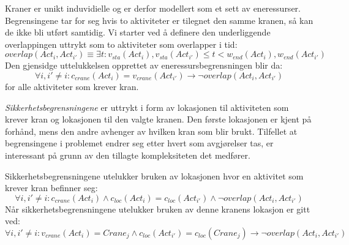 Kraner er unikt induvidielle og er derfor modellert som et sett av eneressurser. Begrensingene tar for seg hvis to aktiviteter er tilegnet den samme kranen, så kan de ikke bli utført samtidig. Vi starter ved å definere den underliggende overlappingen uttrykt som to aktiviteter som overlapper i tid: 
\begin{equation}
overlap(Act_{i},Act_{i'}) \equiv \exists t : v_{sta}(Act_{i}),v_{sta}(Act_{i'}) \leq t < w_{end}(Act_{i}),w_{end}(Act_{i'})
\end{equation}
Den gjensidge uttelukkelsen opprettet av eneressursbegrensningen blir da: 
\begin{equation}
\forall i,i' \neq i : c_{crane}(Act_{i}) = v_{crane}(Act_{i'}) \rightarrow \neg overlap(Act_{i},Act_{i'})
\end{equation}
for alle aktiviteter som krever kran.

\textit{Sikkerhetsbegrensningene} er uttrykt i form av lokasjonen til aktiviteten som krever kran og lokasjonen til den valgte kranen. Den første lokasjonen er kjent på forhånd, mens den andre avhenger av hvilken kran som blir brukt. Tilfellet at begrensingene i problemet endrer seg etter hvert som avgjørelser tas, er interessant på grunn av den tillagte kompleksiteten det medfører.

Sikkerhetsbegrensningene utelukker bruken av lokasjonen hvor en aktivitet som krever kran befinner seg:
\begin{equation}
\forall i,i' \neq i : c_{crane}(Act_{i}) \wedge c_{loc}(Act_{i}) = c_{loc}(Act_{i'}) \wedge \neg overlap(Act_{i},Act_{i'})
\end{equation}
Når sikkerhetsbegrensningene utelukker bruken av denne kranens lokasjon er gitt ved:
\begin{equation}
\forall i,i' \neq i : v_{crane}(Act_{i}) = Crane_{j} \wedge c_{loc}(Act_{i'}) = c_{loc}(Crane_{j}) \rightarrow \neg overlap(Act_{i},Act_{i'})
\end{equation}

